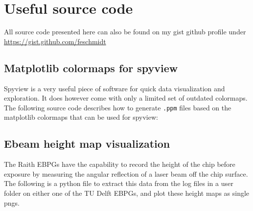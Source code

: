 \chapter{Useful source code}

\clearpage

All source code presented here can also be found on my gist github profile under \url{https://gist.github.com/feschmidt}

\section{Matplotlib colormaps for spyview}\label{app:spyview}
Spyview is a very useful piece of software for quick data visualization and exploration.
It does however come with only a limited set of outdated colormaps.
The following source code describes how to generate \texttt{.ppm} files based on the matplotlib colormaps that can be used for spyview:



\clearpage
\section{Ebeam height map visualization}

The Raith EBPGs have the capability to record the height of the chip before exposure by measuring the angular reflection of a laser beam off the chip surface.
%
The following is a python file to extract this data from the log files in a user folder on either one of the TU Delft EBPGs, and plot these height maps as single pngs.





